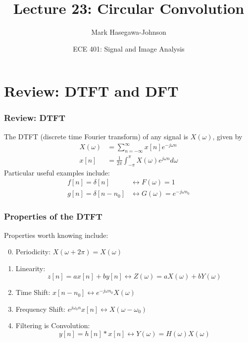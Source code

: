 \documentclass{beamer}
\title{Lecture 23: Circular Convolution}
\author{Mark Hasegawa-Johnson}
\date{ECE 401: Signal and Image Analysis}
\begin{document}
\begin{frame}
  \maketitle
\end{frame}

\begin{frame}
  \tableofcontents
\end{frame}

\section[Review]{Review: DTFT and DFT}
\setcounter{subsection}{1}

\begin{frame}
  \frametitle{Review: DTFT}

  The DTFT (discrete time Fourier transform) of any signal is
  $X(\omega)$, given by
  \begin{align*}
    X(\omega) &= \sum_{n=-\infty}^\infty x[n]e^{-j\omega n}\\
    x[n] &= \frac{1}{2\pi}\int_{-\pi}^\pi X(\omega)e^{j\omega n}d\omega
  \end{align*}
  Particular useful examples include:
  \begin{align*}
    f[n]=\delta[n] &\leftrightarrow F(\omega)=1\\
    g[n]=\delta[n-n_0] &\leftrightarrow G(\omega)=e^{-j\omega n_0}
  \end{align*}
\end{frame}

\begin{frame}
  \frametitle{Properties of the DTFT}

  Properties worth knowing  include:
  \begin{enumerate}
    \setcounter{enumi}{-1}
  \item Periodicity: $X(\omega+2\pi)=X(\omega)$
  \item Linearity:
    \[z[n]=ax[n]+by[n]\leftrightarrow Z(\omega)=aX(\omega)+bY(\omega)
    \]
  \item Time Shift: $x[n-n_0]\leftrightarrow e^{-j\omega n_0}X(\omega)$
  \item Frequency Shift: $e^{j\omega_0 n}x[n]\leftrightarrow X(\omega-\omega_0)$
  \item Filtering is Convolution:
    \[
    y[n]=h[n]\ast x[n]\leftrightarrow Y(\omega)=H(\omega)X(\omega)
    \]
  \end{enumerate}
\end{frame}
\end{document}
